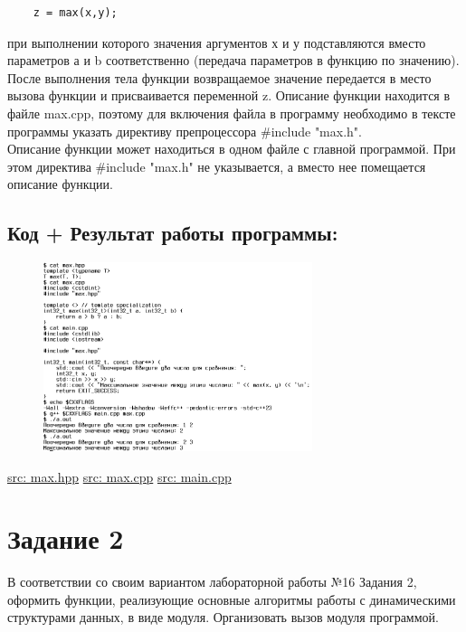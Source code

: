 \documentclass[14pt,a4paper]{article}
\begin{document}
\begin{enumerate}
    \begin{verbatim}
    z = max(x,y);
    \end{verbatim}
    при выполнении которого значения аргументов х и у подставляются вместо
    параметров а и b соответственно (передача параметров в функцию по
    значению). После выполнения тела функции возвращаемое значение передается в
    место вызова функции и присваивается переменной z. Описание функции
    находится в файле max.cpp, поэтому для включения файла в программу
    необходимо в тексте программы указать директиву препроцессора \#include
    "max.h".\\
    Описание функции может находиться в одном файле с главной программой. При
    этом директива \#include "max.h" не указывается, а вместо нее помещается
    описание функции.
\end{enumerate}
\subsection{Код + Результат работы программы:}
\begin{figure}[H]
  \includegraphics[width=0.7\textwidth]{data/demo20_1.png}
\end{figure}
\href{https://raw.githubusercontent.com/John1400800/reports/refs/heads/main/data/tasks20/max.hpp}{src: max.hpp}
\href{https://raw.githubusercontent.com/John1400800/reports/refs/heads/main/data/tasks20/max.cpp}{src: max.cpp}
\href{https://raw.githubusercontent.com/John1400800/reports/refs/heads/main/data/tasks20/main.cpp}{src: main.cpp}
\section*{Задание 2}
В соответствии со своим вариантом лабораторной работы №16 Задания 2, оформить
функции, реализующие основные алгоритмы работы с динамическими структурами
данных, в виде модуля. Организовать вызов модуля программой.
\end{document}
